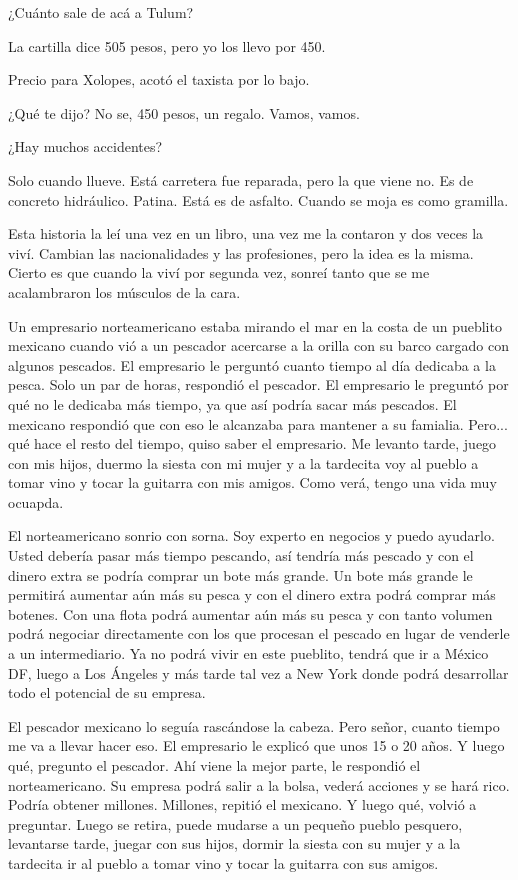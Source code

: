 \documentclass[11pt,twoside,openright,a6paper]{book}
\begin{document}
¿Cuánto sale de acá a Tulum?

La cartilla dice 505 pesos, pero yo los llevo por 450. 

Precio para Xolopes, acotó el taxista por lo bajo.

¿Qué te dijo? No se, 450 pesos, un regalo. Vamos, vamos.


\vspace{1.5cm}
¿Hay muchos accidentes?

Solo cuando llueve. Está carretera fue reparada, pero la que viene no. Es de concreto hidráulico. Patina. Está es de asfalto. Cuando se moja es como gramilla.


\vspace{1.5cm}
Esta historia la leí una vez en un libro, una vez me la contaron y dos veces la viví. Cambian las nacionalidades y las profesiones, pero la idea es la misma. Cierto es que cuando la viví por segunda vez, sonreí tanto que se me acalambraron los músculos de la cara.

Un empresario norteamericano estaba mirando el mar en la costa de un pueblito mexicano cuando vió a un pescador acercarse a la orilla con su barco cargado con algunos pescados. El empresario le perguntó cuanto tiempo al día dedicaba a la pesca. Solo un par de horas, respondió el pescador. El empresario le preguntó por qué no le dedicaba más tiempo, ya que así podría sacar más pescados. El mexicano respondió que con eso le alcanzaba para mantener a su famialia. Pero... qué hace el resto del tiempo, quiso saber el empresario. Me levanto tarde, juego con mis hijos, duermo la siesta con mi mujer y a la tardecita voy al pueblo a tomar vino y tocar la guitarra con mis amigos. Como verá, tengo una vida muy ocuapda.

El norteamericano sonrio con sorna. Soy experto en negocios y puedo ayudarlo. Usted debería pasar más tiempo pescando, así tendría más pescado y con el dinero extra se podría comprar un bote más grande. Un bote más grande le permitirá aumentar aún más su pesca y con el dinero extra podrá comprar más botenes. Con una flota podrá aumentar aún más su pesca y con tanto volumen podrá negociar directamente con los que procesan el pescado en lugar de venderle a un intermediario. Ya no podrá vivir en este pueblito, tendrá que ir a México DF, luego a Los Ángeles y más tarde tal vez a New York donde podrá desarrollar todo el potencial de su empresa.

El pescador mexicano lo seguía rascándose la cabeza. Pero señor, cuanto tiempo me va a llevar hacer eso. El empresario le explicó que unos 15 o 20 años. Y luego qué, pregunto el pescador. Ahí viene la mejor parte, le respondió el norteamericano. Su empresa podrá salir a la bolsa, vederá acciones y se hará rico. Podría obtener millones. Millones, repitió el mexicano. Y luego qué, volvió a preguntar. Luego se retira, puede mudarse a un pequeño pueblo pesquero, levantarse tarde, juegar con sus hijos, dormir la siesta con su mujer y a la tardecita ir al pueblo a tomar vino y tocar la guitarra con sus amigos.
\end{document}
